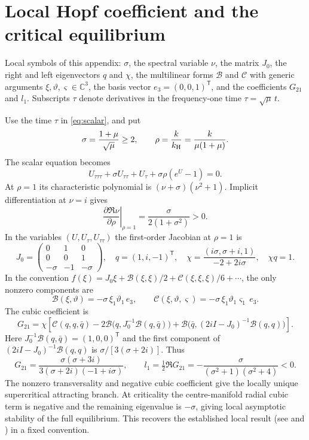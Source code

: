\section{Local Hopf coefficient and the critical equilibrium}\label{app:hopf}
Local symbols of this appendix: $\sigma$, the spectral variable $\nu$, the matrix $J_0$, the right and left eigenvectors $q$ and $\chi$, the multilinear forms $\mathcal B$ and $\mathcal C$ with generic arguments $\xi,\vartheta,\varsigma\in\mathbb C^3$, the basis vector $e_3=(0,0,1)^{\mathsf T}$, and the coefficients $G_{21}$ and $l_1$. Subscripts $\tau$ denote derivatives in the frequency-one time $\tau=\sqrt\mu\,t$.

Use the time $\tau$ in \eqref{eq:scalar}, and put
\[
\sigma=\frac{1+\mu}{\sqrt\mu}\ge2,\qquad
\rho=\frac{k}{k_{\mathrm H}}=\frac{k}{\mu(1+\mu)}.
\]
The scalar equation becomes
\begin{equation}\label{hopf:eq:scaled}
U_{\tau\tau\tau}+\sigma U_{\tau\tau}+U_\tau+\sigma\rho(e^U-1)=0.
\end{equation}
At $\rho=1$ its characteristic polynomial is $(\nu+\sigma)(\nu^2+1)$. Implicit differentiation at $\nu=i$ gives
\[
\left.\frac{\partial\Re\nu}{\partial\rho}\right|_{\rho=1}
=\frac{\sigma}{2(1+\sigma^2)}>0.
\]
In the variables $(U,U_\tau,U_{\tau\tau})$ the first-order Jacobian at $\rho=1$ is
\[
J_0=\begin{pmatrix}0&1&0\\0&0&1\\-\sigma&-1&-\sigma\end{pmatrix},\quad
q=(1,i,-1)^{\mathsf T},\quad
\chi=\frac{(i\sigma,\sigma+i,1)}{-2+2i\sigma},\quad \chi q=1.
\]
In the convention $f(\xi)=J_0\xi+\mathcal B(\xi,\xi)/2+\mathcal C(\xi,\xi,\xi)/6+\cdots$, the only nonzero components are
\[
\mathcal B(\xi,\vartheta)=-\sigma\,\xi_1\vartheta_1\,e_3,\qquad
\mathcal C(\xi,\vartheta,\varsigma)=-\sigma\,\xi_1\vartheta_1\varsigma_1\,e_3.
\]
The cubic coefficient is
\[
G_{21}=\chi\left[\mathcal C(q,q,\bar q)-2\mathcal B\bigl(q,J_0^{-1}\mathcal B(q,\bar q)\bigr)
+\mathcal B\bigl(\bar q,(2iI-J_0)^{-1}\mathcal B(q,q)\bigr)\right].
\]
Here $J_0^{-1}\mathcal B(q,\bar q)=(1,0,0)^{\mathsf T}$ and the first component of $(2iI-J_0)^{-1}\mathcal B(q,q)$ is $\sigma/[3(\sigma+2i)]$. Thus
\begin{equation}\label{hopf:eq:l1}
G_{21}=\frac{\sigma(\sigma+3i)}{3(\sigma+2i)(-1+i\sigma)},\qquad
l_1=\tfrac12\Re G_{21}
=-\frac{\sigma}{(\sigma^2+1)(\sigma^2+4)}<0.
\end{equation}
The nonzero transversality and negative cubic coefficient give the locally unique supercritical attracting branch. At criticality the centre-manifold radial cubic term is negative and the remaining eigenvalue is $-\sigma$, giving local asymptotic stability of the full equilibrium. This recovers the established local result (see \cite{WH95,WH96} and \cite[Theorem~13]{BH23}) in a fixed convention.
